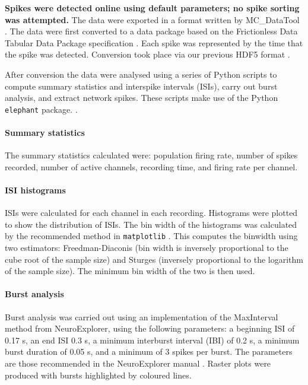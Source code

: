 \documentclass[doublespacing]{bmcart}
\begin{document}
\par \textbf{Spikes were detected online using default parameters; no
  spike sorting was attempted.}  The data were exported in a format written by MC\_DataTool \cite{Systems2014-tw}. The data were first converted to a data package based on the Frictionless Data Tabular Data Package specification \cite{Walsh2017-nm}. Each spike was represented by the time that the spike was detected. Conversion took place via our previous HDF5 format \cite{Eglen2014}.

\par After conversion the data were analysed using a series of Python
scripts to compute summary statistics and interspike intervals (ISIs),
carry out burst analysis, and extract network spikes. These scripts
make use of the Python \texttt{elephant} package.
\cite{elephant_toolkit}.

\paragraph{Summary statistics} The summary statistics calculated were: population firing rate, number of spikes recorded, number of active channels, recording time, and firing rate per channel.

\paragraph{ISI histograms} ISIs were calculated for each channel in each recording. Histograms were plotted to show the distribution of ISIs. The bin width of the histograms was calculated by the recommended method in \texttt{matplotlib} \cite{Community2020-xp}. This computes the binwidth using two estimators: Freedman-Diaconis (bin width is inversely proportional to the cube root of the sample size) and Sturges (inversely proportional to the logarithm of the sample size). The minimum bin width of the two is then used.

\paragraph{Burst analysis} Burst analysis was carried out using an implementation of the MaxInterval method from NeuroExplorer, using the following parameters: a beginning ISI of 0.17 s, an end ISI 0.3 s, a minimum interburst interval (IBI) of 0.2 s, a minimum burst duration of 0.05 s, and a minimum of 3 spikes per burst. The parameters are those recommended in the NeuroExplorer manual \cite{neuroexplorer2020}. Raster plots were produced with bursts highlighted by coloured lines.
\end{document}
